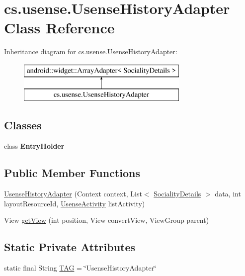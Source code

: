 \hypertarget{classcs_1_1usense_1_1_usense_history_adapter}{}\section{cs.\+usense.\+Usense\+History\+Adapter Class Reference}
\label{classcs_1_1usense_1_1_usense_history_adapter}
Inheritance diagram for cs.\+usense.\+Usense\+History\+Adapter\+:\begin{figure}[H]
\begin{center}
\leavevmode
\includegraphics[height=2.000000cm]{classcs_1_1usense_1_1_usense_history_adapter}
\end{center}
\end{figure}
\subsection*{Classes}
\begin{DoxyCompactItemize}
\item 
class {\bfseries Entry\+Holder}
\end{DoxyCompactItemize}
\subsection*{Public Member Functions}
\begin{DoxyCompactItemize}
\item 
\hyperlink{classcs_1_1usense_1_1_usense_history_adapter_a23fb8f62a14fda08f24976b57732c13e}{Usense\+History\+Adapter} (Context context, List$<$ \hyperlink{classcs_1_1usense_1_1inference_module_1_1_sociality_details}{Sociality\+Details} $>$ data, int layout\+Resource\+Id, \hyperlink{classcs_1_1usense_1_1_usense_activity}{Usense\+Activity} list\+Activity)
\item 
View \hyperlink{classcs_1_1usense_1_1_usense_history_adapter_a2a82418f70b2b291ab6b642fb66c088a}{get\+View} (int position, View convert\+View, View\+Group parent)
\end{DoxyCompactItemize}
\subsection*{Static Private Attributes}
\begin{DoxyCompactItemize}
\item 
static final String \hyperlink{classcs_1_1usense_1_1_usense_history_adapter_aa21dfd706938ed33e7a73beaa07d459f}{T\+A\+G} = \char`\"{}Usense\+History\+Adapter\char`\"{}
\end{DoxyCompactItemize}


